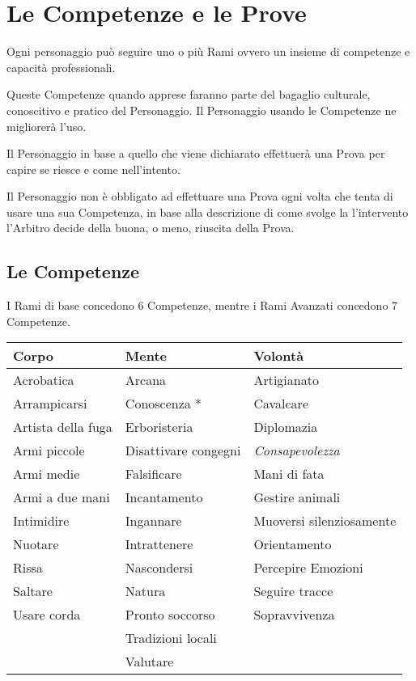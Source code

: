 \documentclass[12pt,a4paper,twoside,openany]{book}
\begin{document}
\pagebreak

\section{Le Competenze e le Prove}

\begin{multicols}{2}

Ogni personaggio può seguire uno o più Rami ovvero un insieme di competenze e capacità professionali.

Queste Competenze quando apprese faranno parte del bagaglio culturale, conoscitivo e pratico del Personaggio. Il Personaggio usando le Competenze ne migliorerà l'uso.

Il Personaggio in base a quello che viene dichiarato effettuerà una Prova per capire se riesce e come nell'intento. 

\begin{narratore}
Il Personaggio non è obbligato ad effettuare una Prova ogni volta che tenta di usare una sua Competenza, in base alla descrizione di come svolge la l'intervento l'Arbitro decide della buona, o meno, riuscita della Prova.	
\end{narratore}

\end{multicols}

\subsection{Le Competenze}

I Rami di base concedono 6 Competenze, mentre i Rami Avanzati concedono 7 Competenze.

\medskip

\begin{tabular*}{0.93\linewidth}{@{\extracolsep{\fill}}lll}
\textbf{Corpo} & \textbf{Mente} & \textbf{Volontà}\\
\toprule
Acrobatica				& Arcana					& Artigianato			\\	
Arrampicarsi			& Conoscenza *				& Cavalcare				\\
Artista della fuga		& Erboristeria				& Diplomazia			\\
Armi piccole 			& Disattivare congegni		& \textit{Consapevolezza}	\\
Armi medie 				& Falsificare				& Mani di fata\\
Armi a due mani			& Incantamento				& Gestire animali\\
Intimidire		 		& Ingannare					& Muoversi silenziosamente\\
Nuotare					& Intrattenere				& Orientamento\\
Rissa					& Nascondersi				& Percepire Emozioni \\ 
Saltare 		 		& Natura					& Seguire tracce\\
Usare corda				& Pronto soccorso			& Sopravvivenza\\
						& Tradizioni locali			&\\
					 	& Valutare					&\\
\end{tabular*}\\
\end{document}
